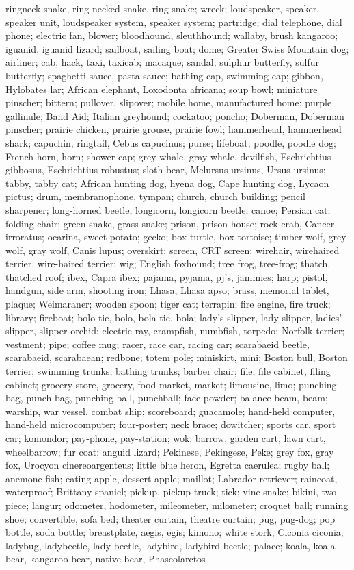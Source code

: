 \documentclass[runningheads]{llncs}
\begin{document}
\begin{enumerate}
ringneck snake, ring-necked snake, ring snake; wreck; loudspeaker, speaker, speaker unit, loudspeaker system, speaker system; partridge; dial telephone, dial phone; electric fan, blower; bloodhound, sleuthhound; wallaby, brush kangaroo; iguanid, iguanid lizard; sailboat, sailing boat; dome; Greater Swiss Mountain dog; airliner; cab, hack, taxi, taxicab; macaque; sandal; sulphur butterfly, sulfur butterfly; spaghetti sauce, pasta sauce; bathing cap, swimming cap; gibbon, Hylobates lar; African elephant, Loxodonta africana; soup bowl; miniature pinscher; bittern; pullover, slipover; mobile home, manufactured home; purple gallinule; Band Aid; Italian greyhound; cockatoo; poncho; Doberman, Doberman pinscher; prairie chicken, prairie grouse, prairie fowl; hammerhead, hammerhead shark; capuchin, ringtail, Cebus capucinus; purse; lifeboat; poodle, poodle dog; French horn, horn; shower cap; grey whale, gray whale, devilfish, Eschrichtius gibbosus, Eschrichtius robustus; sloth bear, Melursus ursinus, Ursus ursinus; tabby, tabby cat; African hunting dog, hyena dog, Cape hunting dog, Lycaon pictus; drum, membranophone, tympan; church, church building; pencil sharpener; long-horned beetle, longicorn, longicorn beetle; canoe; Persian cat; folding chair; green snake, grass snake; prison, prison house; rock crab, Cancer irroratus; ocarina, sweet potato; gecko; box turtle, box tortoise; timber wolf, grey wolf, gray wolf, Canis lupus; overskirt; screen, CRT screen; wirehair, wirehaired terrier, wire-haired terrier; wig; English foxhound; tree frog, tree-frog; thatch, thatched roof; ibex, Capra ibex; pajama, pyjama, pj's, jammies; harp; pistol, handgun, side arm, shooting iron; Lhasa, Lhasa apso; brass, memorial tablet, plaque; Weimaraner; wooden spoon; tiger cat; terrapin; fire engine, fire truck; library; fireboat; bolo tie, bolo, bola tie, bola; lady's slipper, lady-slipper, ladies' slipper, slipper orchid; electric ray, crampfish, numbfish, torpedo; Norfolk terrier; vestment; pipe; coffee mug; racer, race car, racing car; scarabaeid beetle, scarabaeid, scarabaean; redbone; totem pole; miniskirt, mini; Boston bull, Boston terrier; swimming trunks, bathing trunks; barber chair; file, file cabinet, filing cabinet; grocery store, grocery, food market, market; limousine, limo; punching bag, punch bag, punching ball, punchball; face powder; balance beam, beam; warship, war vessel, combat ship; scoreboard; guacamole; hand-held computer, hand-held microcomputer; four-poster; neck brace; dowitcher; sports car, sport car; komondor; pay-phone, pay-station; wok; barrow, garden cart, lawn cart, wheelbarrow; fur coat; anguid lizard; Pekinese, Pekingese, Peke; grey fox, gray fox, Urocyon cinereoargenteus; little blue heron, Egretta caerulea; rugby ball; anemone fish; eating apple, dessert apple; maillot; Labrador retriever; raincoat, waterproof; Brittany spaniel; pickup, pickup truck; tick; vine snake; bikini, two-piece; langur; odometer, hodometer, mileometer, milometer; croquet ball; running shoe; convertible, sofa bed; theater curtain, theatre curtain; pug, pug-dog; pop bottle, soda bottle; breastplate, aegis, egis; kimono; white stork, Ciconia ciconia; ladybug, ladybeetle, lady beetle, ladybird, ladybird beetle; palace; koala, koala bear, kangaroo bear, native bear, Phascolarctos 
\end{enumerate}
\end{document}
